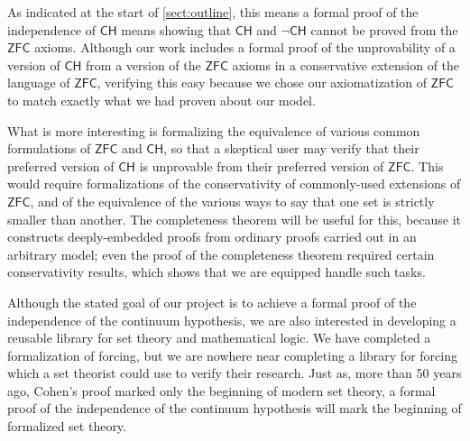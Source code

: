 \documentclass[a4paper,USenglish,cleveref, autoref]{lipics-v2019}
\theoremstyle{definition}
\begin{document}
As indicated at the start of \autoref{sect:outline}, this means a formal proof of the independence of $\mathsf{CH}$ means showing that $\mathsf{CH}$ and $\neg\mathsf{CH}$ cannot be proved from the $\mathsf{ZFC}$ axioms. Although our work includes a formal proof of the unprovability of a version of $\mathsf{CH}$ from a version of the $\mathsf{ZFC}$ axioms in a conservative extension of the language of $\mathsf{ZFC}$, verifying this easy because we chose our axiomatization of $\mathsf{ZFC}$ to match exactly what we had proven about our model.

What is more interesting is formalizing the equivalence of various common formulations of $\mathsf{ZFC}$ and $\mathsf{CH}$, so that a skeptical user may verify that their preferred version of $\mathsf{CH}$ is unprovable from their preferred version of $\mathsf{ZFC}$. This would require formalizations of the conservativity of commonly-used extensions of $\mathsf{ZFC}$, and of the equivalence of the various ways to say that one set is strictly smaller than another. The completeness theorem will be useful for this, because it constructs deeply-embedded proofs from ordinary proofs carried out in an arbitrary model; even the proof of the completeness theorem required certain conservativity results, which shows that we are equipped handle such tasks.

Although the stated goal of our project is to achieve a formal proof of the independence of the continuum hypothesis, we are also interested in developing a reusable library for set theory and mathematical logic. We have completed a formalization of forcing, but we are nowhere near completing a library for forcing which a set theorist could use to verify their research. Just as, more than 50 years ago, Cohen's proof marked only the beginning of modern set theory, a formal proof of the independence of the continuum hypothesis will mark the beginning of formalized set theory.


\end{document}
